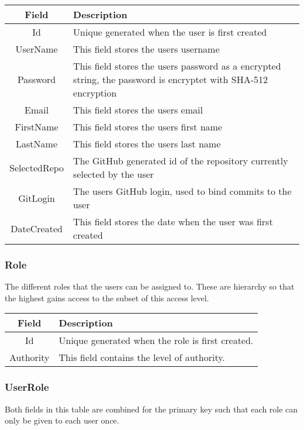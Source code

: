 \vspace{0.5cm}
\begin{tabularx}{\linewidth}{| c | X |}
    \hline
    \rowcolor[gray]{0.8}
    \textbf{Field} & \textbf{Description} \\
    \hline
    Id & Unique generated when the user is first created\\ \hline
    UserName & This field stores the users username\\ \hline
   	Password & This field stores the users password as a encrypted string, the password is encryptet with SHA-512 encryption\\ \hline
    Email & This field stores the users email\\ \hline
    FirstName & This field stores the users first name\\ \hline
    LastName & This field stores the users last name\\ \hline
    SelectedRepo & The GitHub generated id of the repository currently selected by the user\\ \hline
    GitLogin & The users GitHub login, used to bind commits to the user\\ \hline
    DateCreated & This field stores the date when the user was first created\\
    \hline
\end{tabularx}
\vspace{0.5cm}

\subsubsection*{Role}
The different roles that the users can be assigned to. These are hierarchy so that the highest gains access to the subset of this access level. \\

\vspace{0.5cm}
\begin{tabularx}{\linewidth}{| c | X |}
    \hline
    \rowcolor[gray]{0.8}
    \textbf{Field} & \textbf{Description} \\
    \hline
    Id & Unique generated when the role is first created.\\ \hline
    Authority & This field contains the level of authority.\\
    \hline
\end{tabularx}
\vspace{0.5cm}

\subsubsection*{UserRole}
Both fields in this table are combined for the primary key such that each role can only be given to each user once. \\

